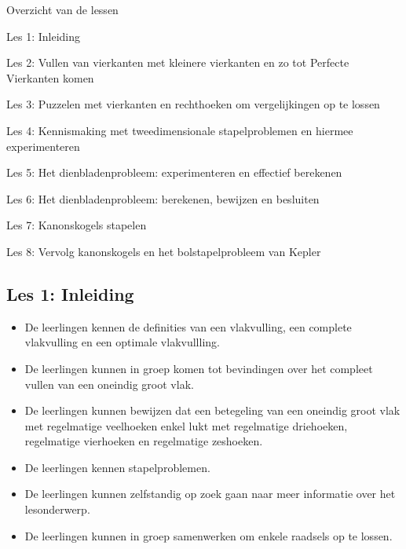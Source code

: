 \documentclass[dutch]{beamer}
\begin{document}
\begin{frame}
{Overzicht van de lessen}
\begin{list}{\quad}{}
\item {\color{blue}Les 1: Inleiding}
\item Les 2: Vullen van vierkanten met kleinere vierkanten en zo tot Perfecte Vierkanten komen
\item Les 3: Puzzelen met vierkanten en rechthoeken om vergelijkingen op te lossen
\item Les 4: Kennismaking met tweedimensionale stapelproblemen en hiermee experimenteren
\item Les 5: Het dienbladenprobleem: experimenteren en effectief berekenen
\item Les 6: Het dienbladenprobleem: berekenen, bewijzen en besluiten
\item Les 7: Kanonskogels stapelen
\item Les 8: Vervolg kanonskogels en het bolstapelprobleem van Kepler
\end{list}
\end{frame}


\subsection{Les 1: Inleiding}
\begin{frame}
\begin{itemize}
\item De leerlingen kennen de definities van een vlakvulling, een complete vlakvulling en een optimale vlakvullling.
\item De leerlingen kunnen in groep komen tot bevindingen over het compleet vullen van een oneindig groot vlak.
\item De leerlingen kunnen bewijzen dat een betegeling van een oneindig groot vlak met regelmatige veelhoeken enkel lukt met regelmatige driehoeken, regelmatige vierhoeken en regelmatige zeshoeken.
\item De leerlingen kennen stapelproblemen.
\item De leerlingen kunnen zelfstandig op zoek gaan naar meer informatie over het lesonderwerp.
\item De leerlingen kunnen in groep samenwerken om enkele raadsels op te lossen.
\end{itemize}
\end{frame}
\end{document}
